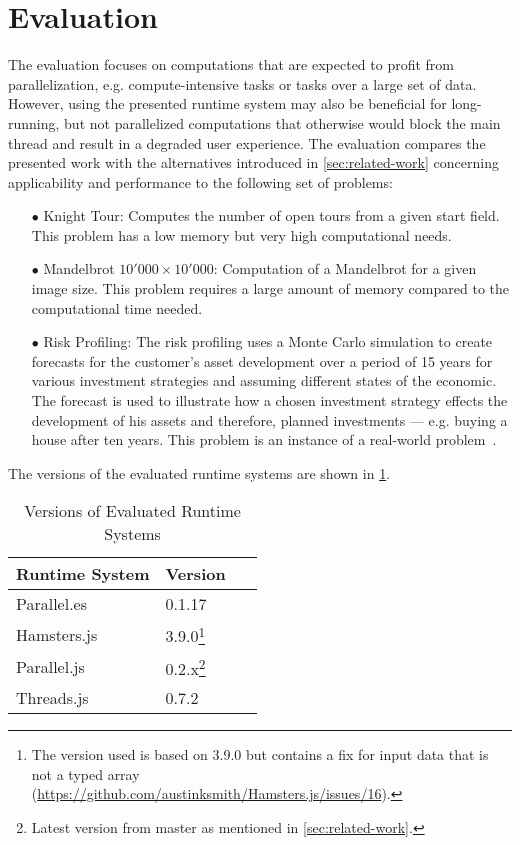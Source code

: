 \section{Evaluation}\label{sec:evaluation}
The evaluation focuses on computations that are expected to profit from parallelization, e.g. compute-intensive tasks or tasks over a large set of data. However, using the presented runtime system may also be beneficial for long-running, but not parallelized computations that otherwise would block the main thread and result in a degraded user experience. The evaluation compares the presented work with the alternatives introduced in \cref{sec:related-work} concerning applicability and performance to the following set of problems:

\begin{itemize}
	\item[$\bullet$] Knight Tour: Computes the number of open tours from a given start field. This problem has a low memory but very high computational needs.
	\item[$\bullet$] Mandelbrot $10'000 \times 10'000$: Computation of a Mandelbrot for a given image size. This problem requires a large amount of memory compared to the computational time needed.
	\item[$\bullet$] Risk Profiling: The risk profiling uses a Monte Carlo simulation to create forecasts for the customer's asset development over a period of 15 years for various investment strategies and assuming different states of the economic. The forecast is used to illustrate how a chosen investment strategy effects the development of his assets and therefore, planned investments --- e.g. buying a house after ten years. This problem is an instance of a real-world problem~\cite{Kwsoft2016}.
\end{itemize}

The versions of the evaluated runtime systems are shown in \cref{tab:runtime-system-version}.

\begin{table}
	\centering
	\begin{tabular}{p{0.6\linewidth} l}
		\toprule
		Runtime System & Version \\ \midrule
		Parallel.es & 0.1.17 \\
		Hamsters.js & 3.9.0\footnote{The version used is based on 3.9.0 but contains a fix for input data that is not a typed array (\url{https://github.com/austinksmith/Hamsters.js/issues/16}).} \\
		Parallel.js & 0.2.x\footnote{Latest version from master as mentioned in \cref{sec:related-work}.} \\
		Threads.js & 0.7.2 \\ \bottomrule
	\end{tabular}
	\caption{Versions of Evaluated Runtime Systems}
	\label{tab:runtime-system-version}
\end{table}


